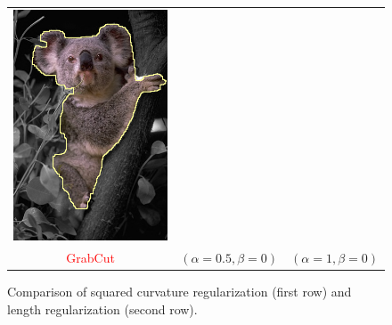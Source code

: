 \documentclass[smallextended]{svjour3}       %
\newcommand{\revision}[1]{\textcolor{red}{#1}}
\begin{document}
{{\begin{figure}[ht!]
\begin{tabular}{ccc}
	\includegraphics[scale=0.25]{segmentation_bc_coala_r3_lg2_sq0_dt1_it50.png} \\

	\revision{GrabCut} & $(\alpha=0.5, \beta=0)$ & $(\alpha=1, \beta=0)$
\end{tabular}	
\caption{Comparison of squared curvature regularization (first row) and length regularization (second row). }
\label{fig:parameters-influence}
\end{figure}

}}
\end{document}
